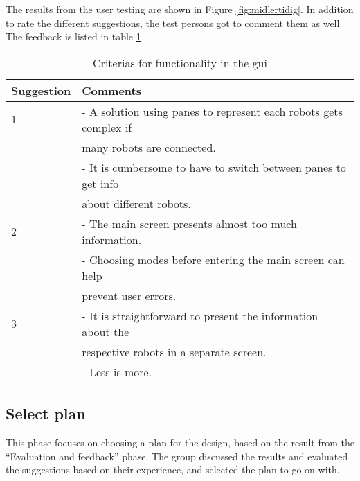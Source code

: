 The results from the user testing are shown in Figure \ref{fig:midlertidig}. In addition to rate the different suggestions, the test persons got to comment them as well. The feedback is listed in table \ref{tab:guifeedback}

\begin{table}[ht]
\begin{center}
\begin{tabular}{|l | l|} 
\hline
Suggestion  &   Comments \\
 \hline
1           &   - A solution using panes to represent each robots gets complex if\\
            &   many robots are connected. \\
            &   - It is cumbersome to have to switch between panes to get info\\
            &   about different robots. \\
\hline
2           &   - The main screen presents almost too much information. \\
            &   - Choosing modes before entering the main screen can help\\
            &   prevent user errors. \\
\hline
3           &   - It is straightforward to present the information about the\\
            &   respective robots in a separate screen. \\
            &   - Less is more. \\
\hline
\end{tabular}
\end{center}
\caption{Criterias for functionality in the \acrshort{gui}}
\label{tab:guifeedback}
\end{table}



\subsection{Select plan}
\label{sec:selectplan}
This phase focuses on choosing a plan for the design, based on the result from the ``Evaluation and feedback'' phase. The group discussed the results and evaluated the suggestions based on their experience, and selected the plan to go on with.